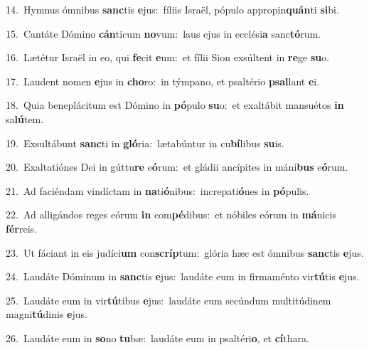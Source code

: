 {\numbfont\textcolor{\numbcolor}{14.}}~Hymnus ómnibus \textbf{sanc}\-tis \textbf{e}\-jus:~\star fíliis Israël, pópulo appropin\-\textbf{quán}\-ti \textbf{si}\-bi.\par
{\numbfont\textcolor{\numbcolor}{15.}}~Cantáte Dómino \textbf{cán}\-ticum \textbf{no}\-vum:~\star laus ejus in ecclési\textbf{a} sanc\-\textbf{tó}\-rum.\par
{\numbfont\textcolor{\numbcolor}{16.}}~Lætétur Israël in eo, qui \textbf{fe}\-cit \textbf{e}\-um:~\star et fílii Sion exsúltent in \textbf{re}\-ge \textbf{su}\-o.\par
{\numbfont\textcolor{\numbcolor}{17.}}~Laudent nomen \textbf{e}\-jus in \textbf{cho}\-ro:~\star in týmpano, et psaltério \textbf{psal}\-lant \textbf{e}\-i.\par
{\numbfont\textcolor{\numbcolor}{18.}}~Quia beneplácitum est Dómino in \textbf{pó}\-pulo \textbf{su}\-o:~\star et exaltábit mansuétos \textbf{in} sa\-\textbf{lú}\-tem.\par
{\numbfont\textcolor{\numbcolor}{19.}}~Exsultábunt \textbf{sanc}\-ti in \textbf{gló}\-ria:~\star lætabúntur in cu\-\textbf{bí}\-libus \textbf{su}\-is.\par
{\numbfont\textcolor{\numbcolor}{20.}}~Exaltatiónes Dei in gúttu\textbf{re} e\-\textbf{ó}\-rum:~\star et gládii ancípites in máni\textbf{bus} e\-\textbf{ó}\-rum.\par
{\numbfont\textcolor{\numbcolor}{21.}}~Ad faciéndam vindíctam in \textbf{na}\-ti\-\textbf{ó}\-nibus:~\star increpati\-\textbf{ó}\-nes in \textbf{pó}\-pulis.\par
{\numbfont\textcolor{\numbcolor}{22.}}~Ad alligándos reges eórum \textbf{in} com\-\textbf{pé}\-dibus:~\star et nóbiles eórum in \textbf{má}\-nicis \textbf{fér}\-reis.\par
{\numbfont\textcolor{\numbcolor}{23.}}~Ut fáciant in eis judíci\textbf{um} con\-\textbf{scríp}\-tum:~\star glória hæc est ómnibus \textbf{sanc}\-tis \textbf{e}\-jus.\par
{\numbfont\textcolor{\numbcolor}{24.}}~Laudáte Dóminum in \textbf{sanc}\-tis \textbf{e}\-jus:~\star laudáte eum in firmaménto vir\-\textbf{tú}\-tis \textbf{e}\-jus.\par
{\numbfont\textcolor{\numbcolor}{25.}}~Laudáte eum in vir\-\textbf{tú}\-tibus \textbf{e}\-jus:~\star laudáte eum secúndum multitúdinem magni\-\textbf{tú}\-dinis \textbf{e}\-jus.\par
{\numbfont\textcolor{\numbcolor}{26.}}~Laudáte eum in \textbf{so}\-no \textbf{tu}\-bæ:~\star laudáte eum in psaltéri\-\textbf{o}\-, et \textbf{cí}\-thara.\par
